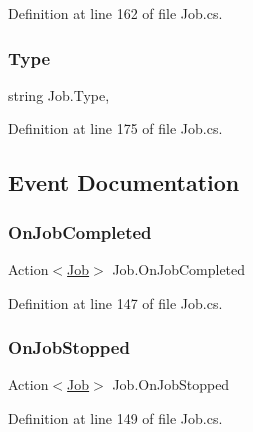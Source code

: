 Definition at line 162 of file Job.\+cs.

\mbox{\label{class_job_a5656d78f1d382334c43364c1318f5c27}} 
\subsubsection{\texorpdfstring{Type}{Type}}
{\footnotesize\ttfamily string Job.\+Type\hspace{0.3cm}{\ttfamily [get]}, {}}



Definition at line 175 of file Job.\+cs.



\subsection{Event Documentation}
\mbox{\label{class_job_aa151ca0107d45278032e493df5a910a5}} 
\subsubsection{\texorpdfstring{On\+Job\+Completed}{OnJobCompleted}}
{\footnotesize\ttfamily Action$<$\hyperlink{class_job}{Job}$>$ Job.\+On\+Job\+Completed}



Definition at line 147 of file Job.\+cs.

\mbox{\label{class_job_a68d63ec0351a545efa009e2afcac72f8}} 
\subsubsection{\texorpdfstring{On\+Job\+Stopped}{OnJobStopped}}
{\footnotesize\ttfamily Action$<$\hyperlink{class_job}{Job}$>$ Job.\+On\+Job\+Stopped}



Definition at line 149 of file Job.\+cs.

\mbox{\label{class_job_a377621134925c1314248ccdd89756e52}} 

